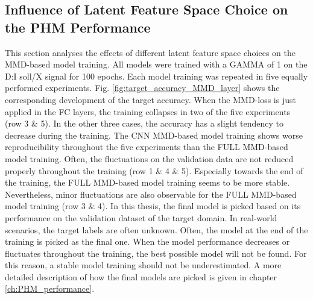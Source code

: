 \subsection{Influence of Latent Feature Space Choice on the PHM Performance}\label{ch:Influence_Layer_real_dataset}
This section analyses the effects of different latent feature space choices on the MMD-based model training. All models were trained with a GAMMA of 1 on the D:I soll/X signal for 100 epochs. Each model training was repeated in five equally performed experiments. Fig. \ref{fig:target_accuracy_MMD_layer} shows the corresponding development of the target accuracy. When the MMD-loss is just applied in the FC layers, the training collapses in two of the five experiments (row 3 $\&$ 5). In the other three cases, the accuracy has a slight tendency to decrease during the training. The CNN MMD-based model training shows worse reproducibility throughout the five experiments than the FULL MMD-based model training. Often, the fluctuations on the validation data are not reduced properly throughout the training (row 1 $\&$ 4 $\&$ 5). Especially towards the end of the training, the FULL MMD-based model training seems to be more stable. Nevertheless, minor fluctuations are also observable for the FULL MMD-based model training (row 3 $\&$ 4). In this thesis, the final model is picked based on its performance on the validation dataset of the target domain. In real-world scenarios, the target labels are often unknown. Often, the model at the end of the training is picked as the final one. When the model performance decreases or fluctuates throughout the training, the best possible model will not be found. For this reason, a stable model training should not be underestimated. A more detailed description of how the final models are picked is given in chapter \ref{ch:PHM_performance}. 

